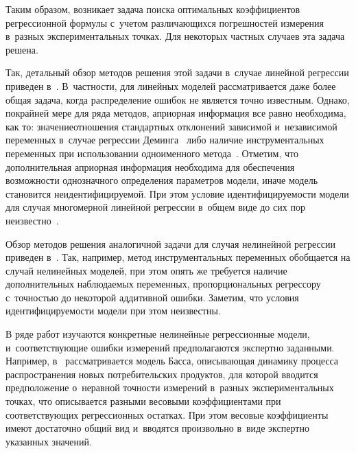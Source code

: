 \begin{multicols}{2}
Таким образом, возникает задача поиска оптимальных коэффициентов регрессионной
формулы с~учетом различающихся погрешностей измерения в~разных экспериментальных 
точках. Для некоторых частных случаев эта задача решена.

Так, детальный обзор методов решения этой задачи
в~случае линейной регрессии приведен в~\cite{gillard2006historical}.
В~частности, для линейных моделей рассматривается даже более общая задача,
когда распределение ошибок не является точно известным.
Однако, по\linebreak крайней мере для ряда методов, априорная инфор\-мация все
равно необходима, как то: значение\linebreak отношения стандартных отклонений
зависимой и~независимой переменных
в~случае регрессии Деминга~\cite{Deming1943Statistical}
либо наличие инструментальных переменных
при использовании одноименного метода~\cite{Bowden1990Instrumental}.
Отметим, что дополнительная априорная информация необходима
для обеспечения воз\-мож\-ности однозначного определения параметров
модели, иначе модель становится неидентифицируемой. При этом
условие идентифицируемости модели для случая многомерной
линейной регрессии в~общем виде до сих пор неизвестно~\cite{Bekker1986Comment}.

Обзор методов решения аналогичной задачи для случая нелинейной
регрессии приведен в~\cite{Carrol06MeasurementErrors}.
Так, например, метод инструментальных переменных
обобщается на случай нелинейных моделей, при этом
опять же требуется наличие дополнительных наблюдаемых переменных,
пропорциональных регрессору с~точ\-ностью до некоторой аддитивной ошибки.
Заметим, что условия иден\-ти\-фи\-ци\-ру\-емости модели при этом неизвестны.

В ряде работ изучаются конкретные нелинейные
регрессионные модели, и~соответствующие ошибки измерений
предполагаются экспертно заданными.
Например, в~\cite{jukic2013nonlinear} рассматривается модель Басса,
описывающая динамику процесса распространения новых потребительских продуктов,
для которой вводится предположение о~неравной точ\-ности измерений в~разных
экспериментальных точках, что описывается разными весовыми коэффициентами при
соответствующих регрессионных остат\-ках. При этом весовые коэффициенты имеют 
достаточно общий вид и~вводятся произвольно в~виде экспертно указанных значений.


\end{multicols}

